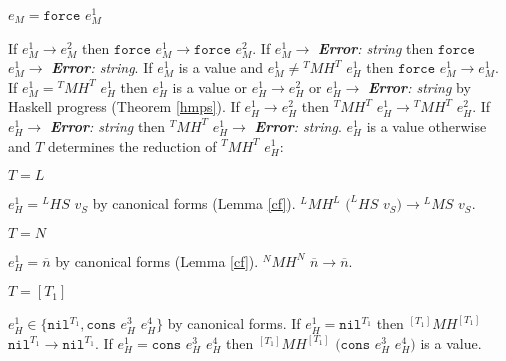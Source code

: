 \begin{case}

$e_{M}=\mathtt{force}$ $e_{M}^{1}$

If $e_{M}^{1}\rightarrow e_{M}^{2}$ then $\mathtt{force}$ $e_{M}^{1}\rightarrow\mathtt{force}$ $e_{M}^{2}$.  If $e_{M}^{1}\rightarrow$ \emph{\textbf{Error}: string} then $\mathtt{force}$ $e_{M}^{1}\rightarrow$ \emph{\textbf{Error}: string}.  If $e_{M}^{1}$ is a value and $e_{M}^{1}\neq{^{T}M}H^{T}$ $e_{H}^{1}$ then $\mathtt{force}$ $e_{M}^{1}\rightarrow e_{M}^{1}$.  If $e_{M}^{1}={^{T}M}H^{T}$ $e_{H}^{1}$ then $e_{H}^{1}$ is a value or $e_{H}^{1}\rightarrow e_{H}^{2}$ or $e_{H}^{1}\rightarrow$ \emph{\textbf{Error}: string} by Haskell progress (Theorem \ref{hmps}).  If $e_{H}^{1}\rightarrow e_{H}^{2}$ then $^{T}MH^{T}$ $e_{H}^{1}\rightarrow{^{T}M}H^{T}$ $e_{H}^{2}$.  If $e_{H}^{1}\rightarrow$ \emph{\textbf{Error}: string} then $^{T}MH^{T}$ $e_{H}^{1}\rightarrow$ \emph{\textbf{Error}: string}.  $e_{H}^{1}$ is a value otherwise and $T$ determines the reduction of $^{T}MH^{T}$ $e_{H}^{1}$:

\begin{subcase}

$T=L$

$e_{H}^{1}={^{L}H}S$ $v_{S}$ by canonical forms (Lemma \ref{cf}).  $^{L}MH^{L}$ $(^{L}HS$ $v_{S})\rightarrow{^{L}M}S$ $v_{S}$.

\end{subcase}

\begin{subcase}

$T=N$

$e_{H}^{1}=\overline{n}$ by canonical forms (Lemma \ref{cf}).  $^{N}MH^{N}$ $\overline{n}\rightarrow\overline{n}$.

\end{subcase}

\begin{subcase}

$T=[T_{1}]$

$e_{H}^{1}\in\lbrace\mathtt{nil}^{T_{1}},\mathtt{cons}$ $e_{H}^{3}$ $e_{H}^{4}\rbrace$ by canonical forms.  If $e_{H}^{1}=\mathtt{nil}^{T_{1}}$ then $^{[T_{1}]}MH^{[T_{1}]}$ $\mathtt{nil}^{T_{1}}\rightarrow\mathtt{nil}^{T_{1}}$.  If $e_{H}^{1}=\mathtt{cons}$ $e_{H}^{3}$ $e_{H}^{4}$ then $^{[T_{1}]}MH^{[T_{1}]}$ $(\mathtt{cons}$ $e_{H}^{3}$ $e_{H}^{4})$ is a value.

\end{subcase}

\begin{subcase}


\end{subcase}
\end{case}
